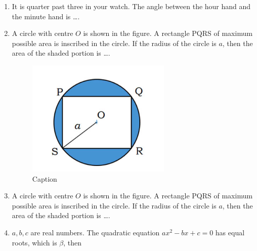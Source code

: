 \documentclass[journal,12pt,onecolumn]{IEEEtran}
\theoremstyle{remark}
\begin{document}
\begin{enumerate}
\item It is quarter past three in your watch. The angle between the hour hand and the minute hand is \dots.
\begin{enumerate}
\end{enumerate}

\item A circle with centre $O$ is shown in the figure. A rectangle PQRS of maximum possible area is inscribed in the circle. If the radius of the circle is $a$, then the area of the shaded portion is \dots.

\begin{figure}[H]
    \centering
    \includegraphics[width=0.5\columnwidth]{figs/Screenshot from 2025-08-17 15-20-45.png}
    \caption{Caption}
    \label{fig:placeholder}
\end{figure}

\item A circle with centre $O$ is shown in the figure. A rectangle PQRS of maximum possible area is inscribed in the circle. If the radius of the circle is $a$, then the area of the shaded portion is \dots.
\begin{enumerate}
\end{enumerate}

\item $a, b, c$ are real numbers. The quadratic equation $a x^2 - b x + c = 0$ has equal roots, which is $\beta$, then
\begin{enumerate}
\end{enumerate}


\end{enumerate}
\end{document}
